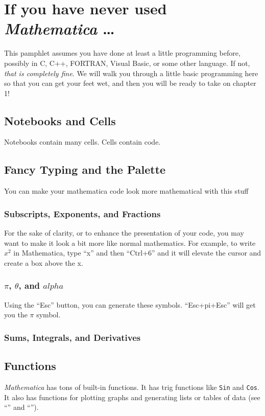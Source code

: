 \chapter*{If you have never used \emph{Mathematica} \ldots }
\label{chap:Prelim}

This pamphlet assumes you have done at least a little programming before, possibly in C, C++, FORTRAN, Visual Basic, or some other language. If not, \emph{that is completely fine}. We will walk you through a little basic programming here so that you can get your feet wet, and then you will be ready to take on chapter 1!

\section{Notebooks and Cells}

Notebooks contain many cells. Cells contain code.

\section{Fancy Typing and the Palette}

You can make your mathematica code look more mathematical with this stuff

\subsection{Subscripts, Exponents, and Fractions}

For the sake of clarity, or to enhance the presentation of your code, you may want to make it look a bit more like normal mathematics. For example, to write $x^2$ in Mathematica, type ``x'' and then ``Ctrl+6'' and it will elevate the cursor and create a box above the x.

\subsection{$\pi$, $\theta$, and $alpha$}

Using the ``Esc'' button, you can generate these symbols. ``Esc+pi+Esc'' will get you the $\pi$ symbol.

\subsection{Sums, Integrals, and Derivatives}

\section{Functions}
\emph{Mathematica} has tons of built-in functions. It has trig functions like \texttt{Sin} and \texttt{Cos}. It also has functions for plotting graphs and generating lists or tables of data (see ``'' and ``'').
